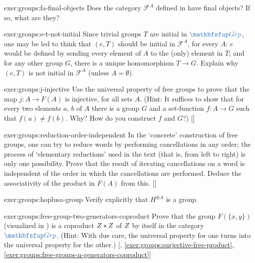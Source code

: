 \begin{exer}{}{exer:groups:fa-final-objects}
  Does the category $\mathscr{F}^A$ defined in
   have final objects?  If
  so, what are they?
\end{exer}
\begin{exer}{}{exer:groups:e-t-not-initial}
  Since trivial groups $T$ are initial in $\categ{Grp}$, one may be
  led to think that $(e,T)$ should be initial in $\mathscr{F}^A$, for
  every $A$: $e$ would be defined by sending every element of $A$ to
  the (only) element in $T$; and for any other group $G$, there is a
  unique homomorphism $T \to G$. Explain why $(e,T)$ is not initial in
  $\mathscr{F}^A$ (unless $A = \emptyset$).
\end{exer}
\begin{exer}{\exerused}{exer:groups:j-injective}
  Use the universal property of free groups to prove that the map
  $j : A \to F(A)$ is injective, for all sets $A$. (Hint: It suffices
  to show that for every two elements $a$, $b$ of $A$ there is a group
  $G$ and a set-function $f : A \to G$ such that $f(a) \neq
  f(b)$. Why? How do you construct $f$ and $G$?)
  []
\end{exer}
\begin{exer}{\exerused}{exer:groups:reduction-order-independent}
  In the `concrete' construction of free groups, one can try to reduce
  words by performing cancellations in any order; the process of
  `elementary reductions' used in the text (that is, from left to
  right) is only one possibility. Prove that the result of iterating
  cancellations on a word is independent of the order in which the
  cancellations are performed. Deduce the associativity of the product
  in $F(A)$ from this. []
\end{exer}
\begin{exer}{}{exer:groups:hoplusa-group}
  Verify explicitly that $H^{\oplus A}$ is a group.
\end{exer}
\begin{exer}{\exerused}{exer:groups:free-group-two-generators-coproduct}
  Prove that the group $F(\{x,y\})$ (visualized in
  ) is a
  coproduct $Z * Z$ of $Z$ by itself in the category
  $\categ{Grp}$. (Hint: With due care, the universal property for one
  turns into the universal property for the other.)
  [,
  \ref{exer:groups:surjective-free-product},
  \ref{exer:groups:free-groups-n-generators-coproduct}]
\end{exer}
